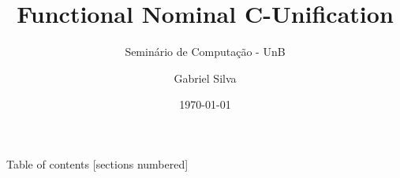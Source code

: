 \documentclass{beamer}
\title{Functional Nominal C-Unification}
\subtitle{Seminário de Computação - UnB}
\date{\today}
\author{Gabriel Silva}
\institute{Advisor: Mauricio Ayala-Rincón \\
Department of Mathematics - University of Brasília}
\begin{document}
\maketitle

\begin{frame}{Table of contents}
    [sections numbered]
    \tableofcontents
\end{frame}

%

%
%
%
%
\end{document}
